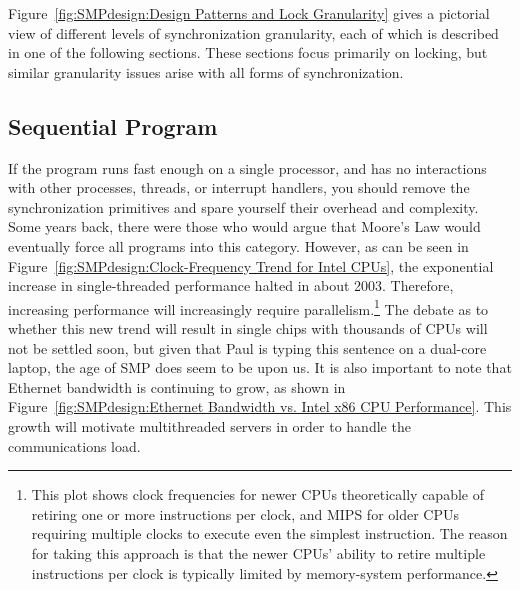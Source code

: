 Figure~\ref{fig:SMPdesign:Design Patterns and Lock Granularity}
gives a pictorial view of different levels of synchronization granularity,
each of which is described in one of the following sections.
These sections focus primarily on locking, but similar granularity
issues arise with all forms of synchronization.

\subsection{Sequential Program}
\label{sec:SMPdesign:Sequential Program}

If the program runs fast enough on a single processor, and
has no interactions with other processes, threads, or interrupt
handlers, you should
remove the synchronization primitives and spare yourself their
overhead and complexity.
Some years back, there were those who would argue that Moore's Law
would eventually force all programs into this category.
However, as can be seen in
Figure~\ref{fig:SMPdesign:Clock-Frequency Trend for Intel CPUs},
the exponential increase in single-threaded performance halted in
about 2003.
Therefore,
increasing performance will increasingly require parallelism.\footnote{
	This plot shows clock frequencies for newer CPUs theoretically
	capable of retiring one or more instructions per clock, and MIPS for
	older CPUs requiring multiple clocks to execute even the
	simplest instruction.
	The reason for taking this approach is that the newer CPUs'
	ability to retire multiple instructions per clock is typically
	limited by memory-system performance.}
The debate as to whether this new trend will result in single chips
with thousands
of CPUs will not be settled soon, but given that Paul is typing this
sentence on a dual-core laptop, the age of SMP does seem to be upon us.
It is also important to note that Ethernet bandwidth is continuing
to grow, as shown in
Figure~\ref{fig:SMPdesign:Ethernet Bandwidth vs. Intel x86 CPU Performance}.
This growth will motivate multithreaded servers in order to handle
the communications load.

